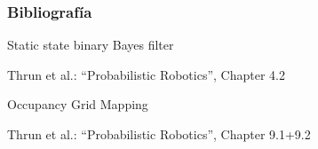 \begin{frame}
	\frametitle{Bibliografía}
   
    Static state binary Bayes filter
    
    Thrun et al.: “Probabilistic Robotics”, Chapter 4.2
    
    Occupancy Grid Mapping
    
    Thrun et al.: “Probabilistic Robotics”, Chapter 9.1+9.2
	
	\printbibliography
	
\end{frame}